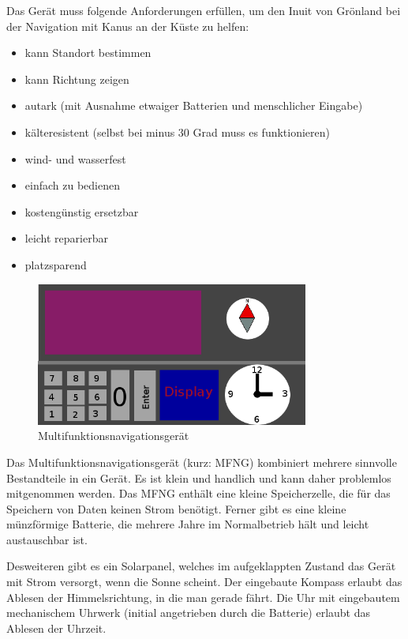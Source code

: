 \documentclass[a4paper,10pt]{scrartcl}
\begin{document}
\kopf
\renewcommand{\figurename}{Figure}


Das Gerät muss folgende Anforderungen erfüllen, um den Inuit von Grönland bei der Navigation mit Kanus an der Küste zu helfen:

\begin{itemize}
	\item kann Standort bestimmen
	\item kann Richtung zeigen
	\item autark (mit Ausnahme etwaiger Batterien und menschlicher Eingabe)
	\item kälteresistent (selbst bei minus 30 Grad muss es funktionieren)
	\item wind- und wasserfest
	\item einfach zu bedienen
	\item kostengünstig ersetzbar
	\item leicht reparierbar
	\item platzsparend
\end{itemize}

	\begin{figure}[ht]
		\centering \includegraphics[width=0.8\textwidth]{images/geraet.png}
		\caption{Multifunktionsnavigationsgerät}
		\label{fig:wwu_logo}
	\end{figure}


Das Multifunktionsnavigationsgerät (kurz: MFNG) kombiniert mehrere sinnvolle Bestandteile in ein Gerät. Es ist klein und handlich und kann daher problemlos mitgenommen werden. Das MFNG enthält eine kleine Speicherzelle, die für das Speichern von Daten keinen Strom benötigt. Ferner gibt es eine kleine münzförmige Batterie, die mehrere Jahre im Normalbetrieb hält und leicht austauschbar ist.

Desweiteren gibt es ein Solarpanel, welches im aufgeklappten Zustand das Gerät mit Strom versorgt, wenn die Sonne scheint. Der eingebaute Kompass erlaubt das Ablesen der Himmelsrichtung, in die man gerade fährt. Die Uhr mit eingebautem mechanischem Uhrwerk (initial angetrieben durch die Batterie) erlaubt das Ablesen der Uhrzeit.
\end{document}
